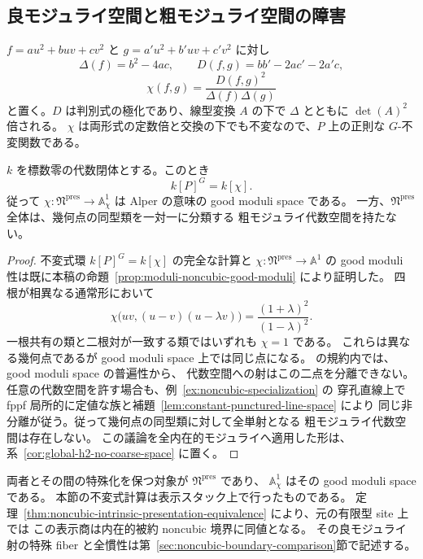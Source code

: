 \subsection{良モジュライ空間と粗モジュライ空間の障害}
\label{subsec:noncubic-good-moduli}

$f=a u^2+buv+c v^2$ と $g=a'u^2+b'uv+c'v^2$ に対し
\[
 \Delta(f)=b^2-4ac,\qquad
 D(f,g)=bb'-2ac'-2a'c,
\]
\[
 \chi(f,g)=\frac{D(f,g)^2}{\Delta(f)\Delta(g)}
\]
と置く。$D$ は判別式の極化であり、線型変換 $A$ の下で
$\Delta$ とともに $\det(A)^2$ 倍される。
$\chi$ は両形式の定数倍と交換の下でも不変なので、$P$ 上の正則な $G$-不変関数である。

\begin{proposition}
\label{prop:noncubic-good-moduli}
$k$ を標数零の代数閉体とする。このとき
\[
 k[P]^G=k[\chi].
\]
従って $\chi:\mathfrak N^{\mathrm{pres}}\to\mathbb A^1_\chi$ は
Alper の意味の good moduli space である。
一方、$\mathfrak N^{\mathrm{pres}}$ 全体は、幾何点の同型類を一対一に分類する
粗モジュライ代数空間を持たない。
\end{proposition}

\begin{proof}
不変式環 $k[P]^G=k[\chi]$ の完全な計算と
$\chi:\mathfrak N^{\mathrm{pres}}\to\mathbb A^1$ の
good moduli 性は既に本稿の命題~\ref{prop:moduli-noncubic-good-moduli} により証明した。
四根が相異なる通常形において
\[
 \chi\bigl(uv,(u-v)(u-\lambda v)\bigr)
 =\frac{(1+\lambda)^2}{(1-\lambda)^2}.
\]
一根共有の類と二根対が一致する類ではいずれも $\chi=1$ である。
これらは異なる幾何点であるが good moduli space 上では同じ点になる。
\cite[Theorem 6.6]{Alper2009} の規約内では、good moduli space の普遍性から、
代数空間への射はこの二点を分離できない。
任意の代数空間を許す場合も、例~\ref{ex:noncubic-specialization} の
穿孔直線上で fppf 局所的に定値な族と補題~\ref{lem:constant-punctured-line-space} により
同じ非分離が従う。従って幾何点の同型類に対して全単射となる
粗モジュライ代数空間は存在しない。
この議論を全内在的モジュライへ適用した形は、系~\ref{cor:global-h2-no-coarse-space} に置く。
\end{proof}

両者とその間の特殊化を保つ対象が $\mathfrak N^{\mathrm{pres}}$ であり、
$\mathbb A^1_\chi$ はその good moduli space である。
本節の不変式計算は表示スタック上で行ったものである。
定理~\ref{thm:noncubic-intrinsic-presentation-equivalence} により、元の有限型 site 上では
この表示商は内在的被約 noncubic 境界に同値となる。
その良モジュライ射の特殊 fiber と全慣性は第~\ref{sec:noncubic-boundary-comparison}節で記述する。


